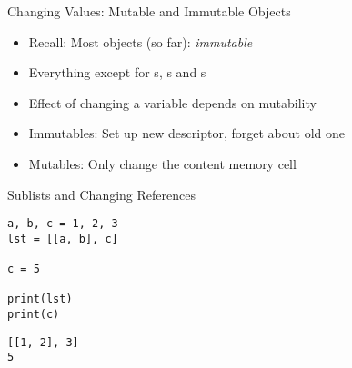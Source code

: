 
\begin{frame}{Changing Values: Mutable and Immutable Objects}
%
\begin{itemize}
\item Recall: Most objects (so far): \emph{immutable}
\item Everything except for s, s and s
\item Effect of changing a variable depends on mutability
\item Immutables: Set up new descriptor, forget about old one
\item Mutables: Only change the content memory cell
\end{itemize}
%
\end{frame}


\begin{frame}[fragile]{Sublists and Changing References}
%
\begin{codebox}
\begin{verbatim}
a, b, c = 1, 2, 3
lst = [[a, b], c]

c = 5

print(lst)
print(c)
\end{verbatim}
\end{codebox}
%
\begin{cmdbox}
\begin{verbatim}
[[1, 2], 3]
5
\end{verbatim}
\end{cmdbox}
%
\end{frame}


